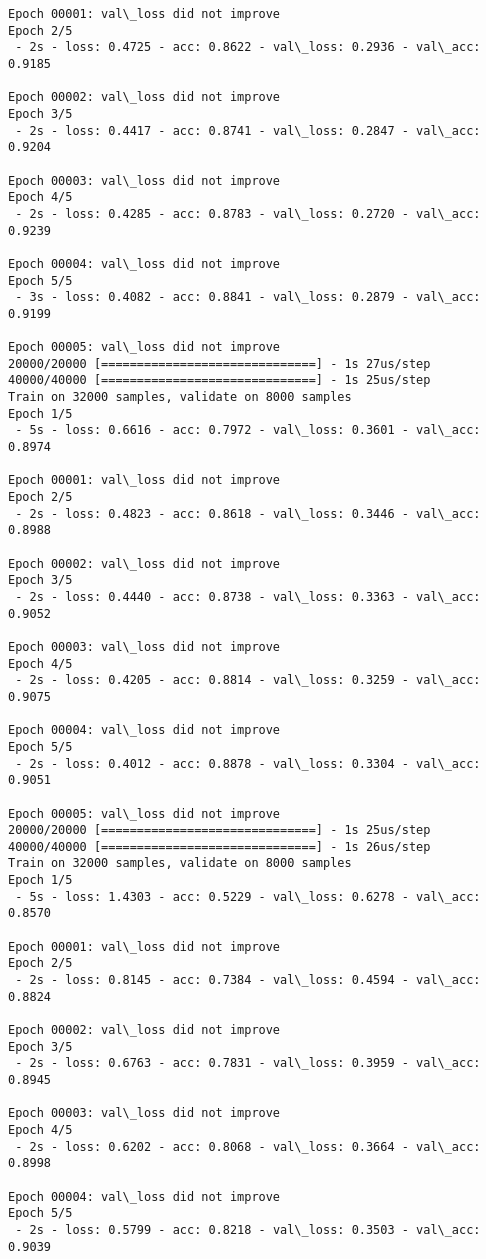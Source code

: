 \documentclass[11pt]{article}
\begin{document}
\begin{Verbatim}[commandchars=\\\{\}]
Epoch 00001: val\_loss did not improve
Epoch 2/5
 - 2s - loss: 0.4725 - acc: 0.8622 - val\_loss: 0.2936 - val\_acc: 0.9185

Epoch 00002: val\_loss did not improve
Epoch 3/5
 - 2s - loss: 0.4417 - acc: 0.8741 - val\_loss: 0.2847 - val\_acc: 0.9204

Epoch 00003: val\_loss did not improve
Epoch 4/5
 - 2s - loss: 0.4285 - acc: 0.8783 - val\_loss: 0.2720 - val\_acc: 0.9239

Epoch 00004: val\_loss did not improve
Epoch 5/5
 - 3s - loss: 0.4082 - acc: 0.8841 - val\_loss: 0.2879 - val\_acc: 0.9199

Epoch 00005: val\_loss did not improve
20000/20000 [==============================] - 1s 27us/step
40000/40000 [==============================] - 1s 25us/step
Train on 32000 samples, validate on 8000 samples
Epoch 1/5
 - 5s - loss: 0.6616 - acc: 0.7972 - val\_loss: 0.3601 - val\_acc: 0.8974

Epoch 00001: val\_loss did not improve
Epoch 2/5
 - 2s - loss: 0.4823 - acc: 0.8618 - val\_loss: 0.3446 - val\_acc: 0.8988

Epoch 00002: val\_loss did not improve
Epoch 3/5
 - 2s - loss: 0.4440 - acc: 0.8738 - val\_loss: 0.3363 - val\_acc: 0.9052

Epoch 00003: val\_loss did not improve
Epoch 4/5
 - 2s - loss: 0.4205 - acc: 0.8814 - val\_loss: 0.3259 - val\_acc: 0.9075

Epoch 00004: val\_loss did not improve
Epoch 5/5
 - 2s - loss: 0.4012 - acc: 0.8878 - val\_loss: 0.3304 - val\_acc: 0.9051

Epoch 00005: val\_loss did not improve
20000/20000 [==============================] - 1s 25us/step
40000/40000 [==============================] - 1s 26us/step
Train on 32000 samples, validate on 8000 samples
Epoch 1/5
 - 5s - loss: 1.4303 - acc: 0.5229 - val\_loss: 0.6278 - val\_acc: 0.8570

Epoch 00001: val\_loss did not improve
Epoch 2/5
 - 2s - loss: 0.8145 - acc: 0.7384 - val\_loss: 0.4594 - val\_acc: 0.8824

Epoch 00002: val\_loss did not improve
Epoch 3/5
 - 2s - loss: 0.6763 - acc: 0.7831 - val\_loss: 0.3959 - val\_acc: 0.8945

Epoch 00003: val\_loss did not improve
Epoch 4/5
 - 2s - loss: 0.6202 - acc: 0.8068 - val\_loss: 0.3664 - val\_acc: 0.8998

Epoch 00004: val\_loss did not improve
Epoch 5/5
 - 2s - loss: 0.5799 - acc: 0.8218 - val\_loss: 0.3503 - val\_acc: 0.9039


\end{Verbatim}
\end{document}
